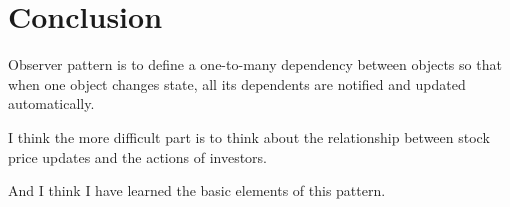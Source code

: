 \documentclass{article}
\begin{document}
\section{Conclusion}

    Observer pattern is to define a one-to-many dependency between objects so that when one object changes state, all its dependents are notified and updated automatically.

    I think the more difficult part is to think about the relationship between stock price updates and the actions of investors.

    And I think I have learned the basic elements of this pattern.
\end{document}
